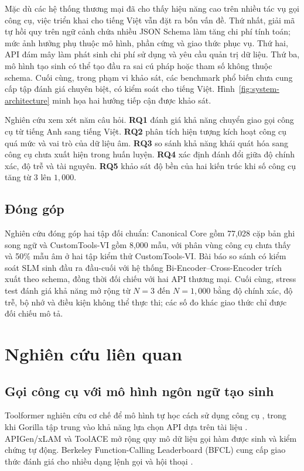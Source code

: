 \documentclass[10pt,twocolumn,a4paper]{article}
\begin{document}
Mặc dù các hệ thống thương mại đã cho thấy hiệu năng cao trên nhiều tác vụ gọi công cụ, việc triển khai cho tiếng Việt vẫn đặt ra bốn vấn đề. Thứ nhất, giải mã tự hồi quy trên ngữ cảnh chứa nhiều JSON Schema làm tăng chi phí tính toán; mức ảnh hưởng phụ thuộc mô hình, phần cứng và giao thức phục vụ. Thứ hai, API đám mây làm phát sinh chi phí sử dụng và yêu cầu quản trị dữ liệu. Thứ ba, mô hình tạo sinh có thể tạo đầu ra sai cú pháp hoặc tham số không thuộc schema. Cuối cùng, trong phạm vi khảo sát, các benchmark phổ biến chưa cung cấp tập đánh giá chuyên biệt, có kiểm soát cho tiếng Việt. Hình~\ref{fig:system-architecture} minh họa hai hướng tiếp cận được khảo sát.

Nghiên cứu xem xét năm câu hỏi. \textbf{RQ1} đánh giá khả năng chuyển giao gọi công cụ từ tiếng Anh sang tiếng Việt. \textbf{RQ2} phân tích hiện tượng kích hoạt công cụ quá mức và vai trò của dữ liệu âm. \textbf{RQ3} so sánh khả năng khái quát hóa sang công cụ chưa xuất hiện trong huấn luyện. \textbf{RQ4} xác định đánh đổi giữa độ chính xác, độ trễ và tài nguyên. \textbf{RQ5} khảo sát độ bền của hai kiến trúc khi số công cụ tăng từ $3$ lên $1{,}000$.

\subsection{Đóng góp}
Nghiên cứu đóng góp hai tập đối chuẩn: Canonical Core gồm 77,028 cặp bản ghi song ngữ và CustomTools-VI gồm 8,000 mẫu, với phân vùng công cụ chưa thấy và 50\% mẫu âm ở hai tập kiểm thử CustomTools-VI. Bài báo so sánh có kiểm soát SLM sinh đầu ra đầu-cuối với hệ thống Bi-Encoder--Cross-Encoder trích xuất theo schema, đồng thời đối chiếu với hai API thương mại. Cuối cùng, stress test đánh giá khả năng mở rộng từ $N=3$ đến $N=1{,}000$ bằng độ chính xác, độ trễ, bộ nhớ và điều kiện không thể thực thi; các số đo khác giao thức chỉ được đối chiếu mô tả.


\section{Nghiên cứu liên quan}

\subsection{Gọi công cụ với mô hình ngôn ngữ tạo sinh}
Toolformer nghiên cứu cơ chế để mô hình tự học cách sử dụng công cụ \cite{schick2023toolformer}, trong khi Gorilla tập trung vào khả năng lựa chọn API dựa trên tài liệu \cite{patil2023gorilla}. APIGen/xLAM \cite{liu2024apigen} và ToolACE \cite{liu2024toolace} mở rộng quy mô dữ liệu gọi hàm được sinh và kiểm chứng tự động. Berkeley Function-Calling Leaderboard (BFCL) cung cấp giao thức đánh giá cho nhiều dạng lệnh gọi và hội thoại \cite{yan2024bfcl}.
\end{document}
